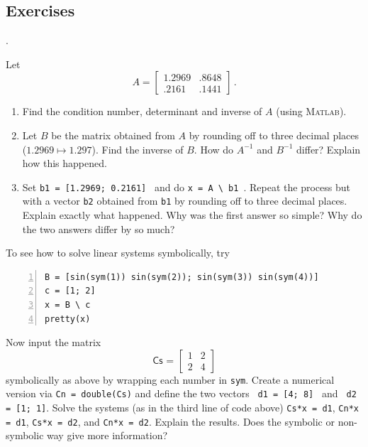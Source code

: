 \subsection*{Exercises}
\begin{list}
{.}{}

\item Let $$
A = \left[
{\begin{array}{cc}
1.2969 & .8648 \\
.2161 & .1441
\end{array}}
 \right]\,.
$$
\begin{enumerate}
\item[(a)] Find the condition number, determinant and inverse of $A$ (using \textsc{Matlab}).
\item[(b)] Let $B$ be the matrix obtained from $A$ by rounding off to three
  decimal places ($1.2969\mapsto 1.297$).  Find the inverse of $B$.  
  How do $A^{-1}$ and $B^{-1}$ differ? Explain how
  this happened.
\item[(c)] Set \verb&b1 = [1.2969; 0.2161] & and do \verb&x = A \ b1 &.
  Repeat the process but with a vector \verb&b2& obtained from
  \verb&b1& by rounding off to three decimal places. Explain exactly
  what happened.  Why was the first answer so simple?  Why do the two
  answers differ by so much?
\end{enumerate}

\item To see how to solve linear systems symbolically, try
\begin{lstlisting}[frame=none,numbers=left]
B = [sin(sym(1)) sin(sym(2)); sin(sym(3)) sin(sym(4))]
c = [1; 2]
x = B \ c
pretty(x)
\end{lstlisting}

Now input the matrix
\[
\textsf{Cs = }\left[
\begin{array}{rr}
1 & 2 \\
2 & 4
\end{array}
\right]
\]
symbolically as above by wrapping each number in \verb&sym&. Create a numerical version via
\verb&Cn = double(Cs)& and define the two vectors \verb$ d1 = [4; 8] $ and
\verb$ d2 = [1; 1]$.
Solve the systems (as in the third line of code above) \verb&Cs*x = d1&, \verb&Cn*x = d1&,
\verb&Cs*x = d2&, and \verb&Cn*x = d2&.
Explain the results.  Does the symbolic or
non-symbolic way give more information?
%


\end{list}

